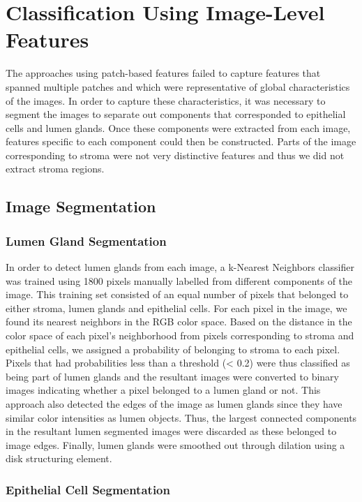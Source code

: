 \section{Classification Using Image-Level Features}
The approaches using patch-based features failed to capture features that spanned multiple patches and which were representative of global characteristics of the images. 
In order to capture these characteristics, it was necessary to segment the images to separate out components that corresponded to epithelial cells and lumen glands. 
Once these components were extracted from each image, features specific to each component could then be constructed. Parts of the image corresponding to stroma were not very distinctive features and thus we did not extract stroma regions.

\subsection{Image Segmentation}

\subsubsection{Lumen Gland Segmentation}

In order to detect lumen glands from each image, a k-Nearest Neighbors classifier was trained using 1800 pixels manually labelled from different components of the image. This training set consisted of an equal number of pixels that belonged to either stroma, lumen glands and epithelial cells. For each pixel in the image, we found its nearest neighbors in the RGB color space. Based on the distance in the color space of each pixel's neighborhood from pixels corresponding to stroma and epithelial cells, we assigned a probability of belonging to stroma to each pixel. Pixels that had probabilities less than a threshold (< 0.2) were thus classified as being part of lumen glands and the resultant images were converted to binary images indicating whether a pixel belonged to a lumen gland or not. This approach also detected the edges of the image as lumen glands since they have similar color intensities as lumen objects. Thus, the largest connected components in the resultant lumen segmented images were discarded as these belonged to image edges. Finally, lumen glands were smoothed out through dilation using a disk structuring element.

\subsubsection{Epithelial Cell Segmentation}

